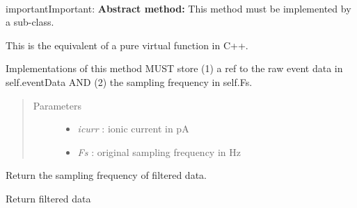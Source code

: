 \documentclass[letterpaper,10pt,english]{sphinxmanual}
\begin{document}
\begin{fulllineitems}
\begin{fulllineitems}
\end{fulllineitems}


\begin{fulllineitems}
\label{api-doc/mosaic.meta:mosaic.metaIOFilter.metaIOFilter.filterData}~
\begin{notice}{important}{Important:}
\textbf{Abstract method:} This method must be implemented by a sub-class.
\end{notice}

This is the equivalent of a pure virtual function in C++.

Implementations of this method MUST store (1) a ref to the raw event data in self.eventData AND 
(2) the sampling frequency in self.Fs.
\begin{quote}\begin{description}
\item[{Parameters}] \leavevmode\begin{itemize}
\item {} 
\emph{icurr} :     ionic current in pA

\item {} 
\emph{Fs} :        original sampling frequency in Hz

\end{itemize}

\end{description}\end{quote}

\end{fulllineitems}


\begin{fulllineitems}
\label{api-doc/mosaic.meta:mosaic.metaIOFilter.metaIOFilter.filterFs}
Return the sampling frequency of filtered data.

\end{fulllineitems}


\begin{fulllineitems}
\label{api-doc/mosaic.meta:mosaic.metaIOFilter.metaIOFilter.filteredData}
Return filtered data

\end{fulllineitems}


\end{fulllineitems}
\end{document}
